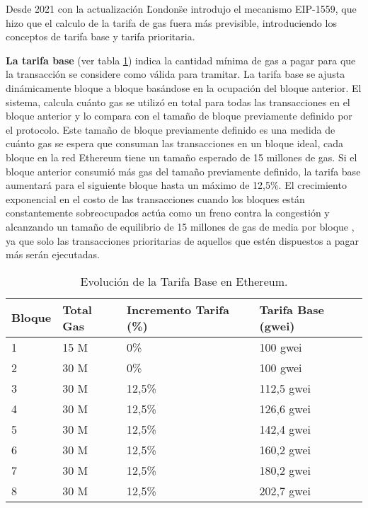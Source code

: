 Desde 2021 con la actualización \"London\" se introdujo el mecanismo EIP-1559, que hizo que el calculo de la tarifa de gas fuera más previsible, introduciendo los conceptos de tarifa 
base y tarifa prioritaria.

\textbf{La tarifa base} (ver tabla \ref{tab:ajuste_tarifa_base}) indica la cantidad mínima de gas a pagar para que la transacción se considere como válida para tramitar.
La tarifa base se ajusta dinámicamente bloque a bloque basándose en la ocupación del bloque anterior. El sistema, calcula cuánto gas se utilizó en total para todas las transacciones en el bloque anterior y lo compara con el tamaño de bloque previamente definido por el protocolo. Este tamaño de bloque previamente definido es una medida de cuánto gas se espera que consuman las transacciones en un bloque ideal, cada bloque en la red Ethereum tiene un tamaño esperado de 15 millones de gas.
Si el bloque anterior consumió más gas del tamaño previamente definido, la tarifa base aumentará para el siguiente bloque hasta un máximo de 12,5\%. 
El crecimiento exponencial en el costo de las transacciones cuando los bloques están constantemente sobreocupados actúa como un freno contra la congestión y alcanzando un tamaño de equilibrio de 15 millones de gas de media por bloque , ya que solo las transacciones prioritarias de aquellos que estén dispuestos a pagar más serán ejecutadas.

\begin{table}
\normalsize
\begin{centering}
	\begin{tabular}{@{}p{4em} p{5em} p{6em} p{6em}@{}}
		\toprule
		\textbf{Bloque} & \textbf{Total Gas} & \textbf{Incremento Tarifa (\%)} & \textbf{Tarifa Base (gwei)}\\ 
		\midrule
		1 & 15 M & 0\% & 100 gwei \\
		2 & 30 M & 0\% & 100 gwei\\
		3 & 30 M & 12,5\% & 112,5 gwei\\
		4 & 30 M & 12,5\% & 126,6 gwei\\
		5 & 30 M & 12,5\% & 142,4 gwei\\
		6 & 30 M & 12,5\% & 160,2 gwei\\
		7 & 30 M & 12,5\% & 180,2 gwei\\
		8 & 30 M & 12,5\% & 202,7 gwei\\
		\bottomrule
	\end{tabular}
\caption[Ajuste de la Tarifa Base Bajo Demanda]{Evolución de la Tarifa Base en Ethereum.}
\label{tab:ajuste_tarifa_base}
\end{centering}
\end{table}


